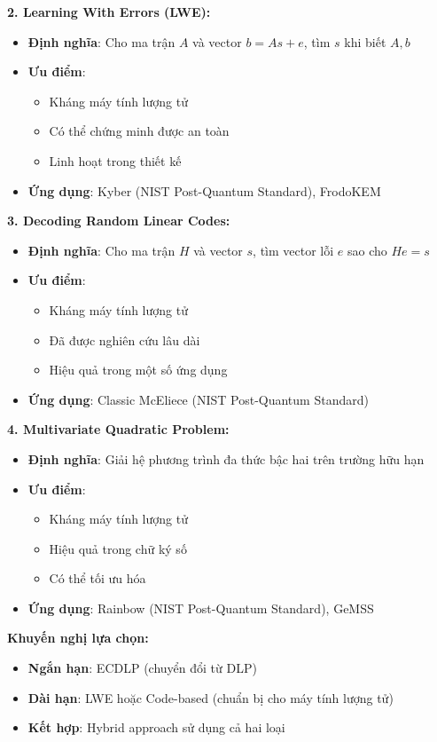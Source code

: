 \textbf{2. Learning With Errors (LWE):}
\begin{itemize}
    \item \textbf{Định nghĩa}: Cho ma trận $A$ và vector $b = As + e$, tìm $s$ khi biết $A, b$
    \item \textbf{Ưu điểm}:
    \begin{itemize}
        \item Kháng máy tính lượng tử
        \item Có thể chứng minh được an toàn
        \item Linh hoạt trong thiết kế
    \end{itemize}
    \item \textbf{Ứng dụng}: Kyber (NIST Post-Quantum Standard), FrodoKEM
\end{itemize}

\textbf{3. Decoding Random Linear Codes:}
\begin{itemize}
    \item \textbf{Định nghĩa}: Cho ma trận $H$ và vector $s$, tìm vector lỗi $e$ sao cho $He = s$
    \item \textbf{Ưu điểm}:
    \begin{itemize}
        \item Kháng máy tính lượng tử
        \item Đã được nghiên cứu lâu dài
        \item Hiệu quả trong một số ứng dụng
    \end{itemize}
    \item \textbf{Ứng dụng}: Classic McEliece (NIST Post-Quantum Standard)
\end{itemize}

\textbf{4. Multivariate Quadratic Problem:}
\begin{itemize}
    \item \textbf{Định nghĩa}: Giải hệ phương trình đa thức bậc hai trên trường hữu hạn
    \item \textbf{Ưu điểm}:
    \begin{itemize}
        \item Kháng máy tính lượng tử
        \item Hiệu quả trong chữ ký số
        \item Có thể tối ưu hóa
    \end{itemize}
    \item \textbf{Ứng dụng}: Rainbow (NIST Post-Quantum Standard), GeMSS
\end{itemize}

\textbf{Khuyến nghị lựa chọn:}
\begin{itemize}
    \item \textbf{Ngắn hạn}: ECDLP (chuyển đổi từ DLP)
    \item \textbf{Dài hạn}: LWE hoặc Code-based (chuẩn bị cho máy tính lượng tử)
    \item \textbf{Kết hợp}: Hybrid approach sử dụng cả hai loại
\end{itemize}


